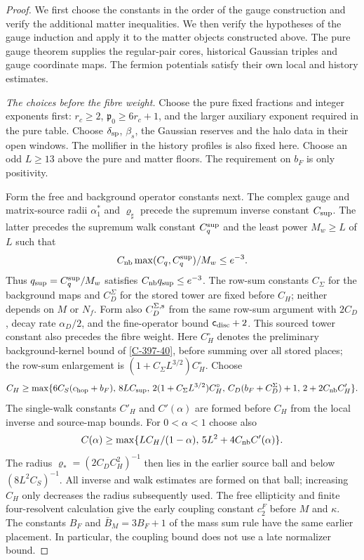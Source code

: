 \documentclass[11pt,letterpaper,reqno]{amsart}
\theoremstyle{definition}
\theoremstyle{remark}
\begin{document}
\begin{proof}
We first choose the constants in the order of the gauge
construction and verify the additional matter inequalities.
We then verify the hypotheses of the gauge induction and
apply it to the matter objects constructed above. The pure
gauge theorem supplies the regular-pair cores, historical
Gaussian triples and gauge coordinate maps. The fermion
potentials satisfy their own local and history estimates.

\emph{The choices before the fibre weight.}
Choose the pure fixed fractions and integer exponents first:
$r_c\ge2$, $\mathfrak p_0\ge6r_c+1$, and the larger auxiliary
exponent required in the pure table. Choose $\delta_{\rm sp}$,
$\beta_s$, the Gaussian reserves and the halo data in their
open windows. The mollifier in the history profiles is also
fixed here. Choose an odd $L\ge13$ above the pure and matter
floors. The requirement on $b_F$ is only positivity.

Form the free and background operator constants next.
The complex gauge and matrix-source radii $\alpha_1^*$ and
$\varrho_\sharp$ precede the supremum inverse constant
$C_{\rm sup}$. The latter precedes the supremum walk constant
$C_q^{\rm sup}$ and the least power $M_w\ge L$ of $L$ such that
\[
 C_{\rm nb}\max(C_q,C_q^{\rm sup})/M_w\le e^{-3}.
\]
Thus $q_{\rm sup}=C_q^{\rm sup}/M_w$ satisfies
$C_{\rm nb}q_{\rm sup}\le e^{-3}$.
The row-sum constants $C_\Sigma$ for the background maps
and $C_D^\Sigma$ for the stored tower are fixed before
$C_H$; neither depends on $M$ or $N_f$.
Form also $C_D^{\Sigma,{\rm s}}$ from
the same row-sum argument with $2C_D$, decay rate $\alpha_D/2$,
and the fine-operator bound $\mathsf c_{\rm disc}+2$.
This sourced tower constant also precedes the fibre weight.
Here $C_H^\circ$ denotes the preliminary background-kernel bound
of \cref{C-397-40}, before summing over all stored places; the
row-sum enlargement is $(1+C_\Sigma L^{3/2})C_H^\circ$. Choose
\[
 C_H\ge\max\{6C_S(c_{\rm hop}+b_F),\,8LC_{\rm sup},\,
 2(1+C_\Sigma L^{3/2})C_H^\circ,\,
 C_D(b_F+C_D^\Sigma)+1,\,2+2C_{\rm nb}C'_H\}.
\]
The single-walk constants $C'_H$ and $C'(\alpha)$ are formed
before $C_H$ from the local inverse and source-map bounds.
For $0<\alpha<1$ choose also
\[
 C(\alpha)\ge\max\{LC_H/(1-\alpha),\,
                         5L^2+4C_{\rm nb}C'(\alpha)\}.
\]
The radius $\varrho_*=(2C_DC_H^2)^{-1}$ then lies in the
earlier source ball and below $(8L^2C_S)^{-1}$.
All inverse and walk estimates are formed on that ball;
increasing $C_H$ only decreases the radius subsequently used.
The free ellipticity and finite four-resolvent calculation
give the early coupling constant $c_2^F$ before $M$ and
$\kappa$. The constants $B_F$ and $\bar B_M=3B_F+1$ of the
mass sum rule have the same earlier placement. In particular,
the coupling bound does not use a late normalizer bound.


\end{proof}
\end{document}
